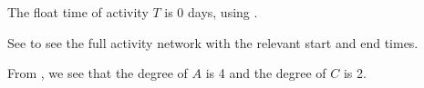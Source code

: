 \begin{subquestions}
\begin{subsubquestions}

\subsubquestion

The float time of activity $T$ is 0 days, using .

\end{subsubquestions}

See  to see the full activity network with the relevant start and end times.


\subquestion

From , we see that the degree of $A$ is 4 and the degree of $C$ is 2.


\subquestion

\begin{subsubquestions}

\subsubquestion 


\end{subsubquestions}
\end{subquestions}
